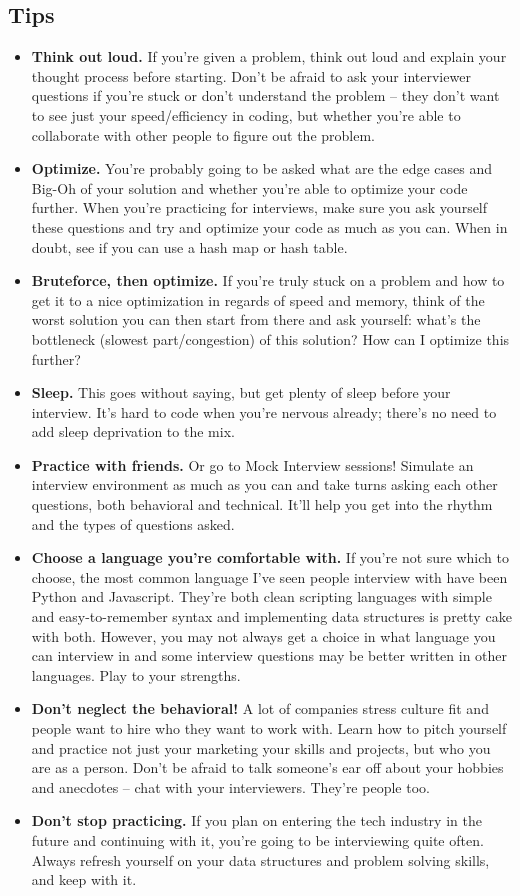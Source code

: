 \documentclass{article}
\begin{document}
\subsection {Tips}
\begin{itemize}
    \item \textbf{Think out loud.} If you're given a problem, think out loud and explain your thought process before starting. Don't be afraid to ask your interviewer questions if you're stuck or don't understand the problem -- they don't want to see just your speed/efficiency in coding, but whether you're able to collaborate with other people to figure out the problem. 
    \item \textbf{Optimize.} You're probably going to be asked what are the edge cases and Big-Oh of your solution and whether you're able to optimize your code further. When you're practicing for interviews, make sure you ask yourself these questions and try and optimize your code as much as you can. When in doubt, see if you can use a hash map or hash table. 
    \item \textbf {Bruteforce, then optimize.} If you're truly stuck on a problem and how to get it to a nice optimization in regards of speed and memory, think of the worst solution you can then start from there and ask yourself: what's the bottleneck (slowest part/congestion) of this solution? How can I optimize this further? 
    \item \textbf{Sleep.} This goes without saying, but get plenty of sleep before your interview. It's hard to code when you're nervous already; there's no need to add sleep deprivation to the mix.
    \item \textbf{Practice with friends.} Or go to Mock Interview sessions! Simulate an interview environment as much as you can and take turns asking each other questions, both behavioral and technical. It'll help you get into the rhythm and the types of questions asked.
    \item \textbf{Choose a language you're comfortable with.} If you're not sure which to choose, the most common language I've seen people interview with have been Python and Javascript. They're both clean scripting languages with simple and easy-to-remember syntax and implementing data structures is pretty cake with both. However, you may not always get a choice in what language you can interview in and some interview questions may be better written in other languages. Play to your strengths.
    \item \textbf{Don't neglect the behavioral!} A lot of companies stress culture fit and people want to hire who they want to work with. Learn how to pitch yourself and practice not just your marketing your skills and projects, but who you are as a person. Don't be afraid to talk someone's ear off about your hobbies and anecdotes -- chat with your interviewers. They're people too.
    \item \textbf{Don't stop practicing.} If you plan on entering the tech industry in the future and continuing with it, you're going to be interviewing quite often. Always refresh yourself on your data structures and problem solving skills, and keep with it.
\end{itemize}
\end{document}
